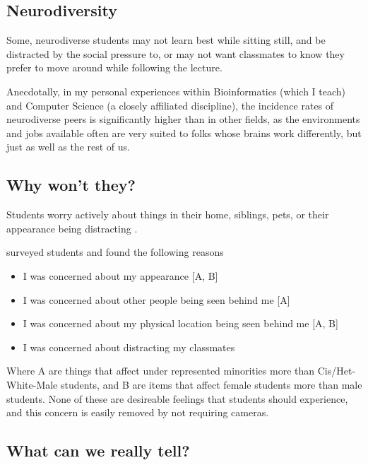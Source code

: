 \documentclass[paper=a4,justified,a4paper]{tufte-handout}
\providecommand{\tightlist}{%
  \setlength{\itemsep}{0pt}\setlength{\parskip}{0pt}}
\begin{document}
\hypertarget{neurodiversity}{%
\subsection{Neurodiversity}\label{neurodiversity}}

Some, neurodiverse students may not learn best while sitting still, and
be distracted by the social pressure to, or may not want classmates to
know they prefer to move around while following the
lecture\citep{duncan2021}.

Anecdotally, in my personal experiences within Bioinformatics (which I
teach) and Computer Science (a closely affiliated discipline), the
incidence rates of neurodiverse peers is significantly higher than in
other fields, as the environments and jobs available often are very
suited to folks whose brains work differently, but just as well as the
rest of us.

\hypertarget{why-wont-they}{%
\subsection{Why won't they?}\label{why-wont-they}}

Students worry actively about things in their home, siblings, pets, or
their appearance being distracting .

\citep{10.1002/ece3.7123} surveyed students and found the following
reasons

\begin{itemize}
\tightlist
\item
  I was concerned about my appearance {[}A, B{]}
\item
  I was concerned about other people being seen behind me {[}A{]}
\item
  I was concerned about my physical location being seen behind me {[}A,
  B{]}
\item
  I was concerned about distracting my classmates
\end{itemize}

Where A are things that affect under represented minorities more than
Cis/Het-White-Male students, and B are items that affect female students
more than male students. None of these are desireable feelings that
students should experience, and this concern is easily removed by not
requiring cameras.

\hypertarget{what-can-we-really-tell}{%
\subsection{What can we really tell?}\label{what-can-we-really-tell}}
\end{document}
